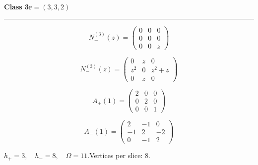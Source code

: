 \noindent\begin{minipage}{\linewidth}
\noindent\textbf{Class 3}\hfill $\symbf{r}=(3,3,2)$
\par\smallskip\noindent\textcolor{rulegray}{\rule{\linewidth}{0.3pt}}
\begin{minipage}[c]{0.495\linewidth}\centering\fontsize{10.5}{13}\selectfont
\setlength{\abovedisplayskip}{3pt}\setlength{\belowdisplayskip}{3pt}
\setlength{\abovedisplayshortskip}{3pt}\setlength{\belowdisplayshortskip}{3pt}
\setlength{\arraycolsep}{3.5pt}\renewcommand{\arraystretch}{1.18}
\[N_{+}^{(3)}(z)=\begin{pmatrix}0 & 0 & 0\\0 & 0 & 0\\0 & 0 & z\end{pmatrix}\]
\end{minipage}%
\begin{minipage}[c]{0.495\linewidth}\centering\fontsize{10.5}{13}\selectfont
\setlength{\abovedisplayskip}{3pt}\setlength{\belowdisplayskip}{3pt}
\setlength{\abovedisplayshortskip}{3pt}\setlength{\belowdisplayshortskip}{3pt}
\setlength{\arraycolsep}{3.5pt}\renewcommand{\arraystretch}{1.18}
\[N_{-}^{(3)}(z)=\begin{pmatrix}0 & z & 0\\z^{2} & 0 & z^{2} + z\\0 & z & 0\end{pmatrix}\]
\end{minipage}%
\par\noindent
\begin{minipage}[c]{0.495\linewidth}\centering\fontsize{10.5}{13}\selectfont
\setlength{\abovedisplayskip}{3pt}\setlength{\belowdisplayskip}{3pt}
\setlength{\abovedisplayshortskip}{3pt}\setlength{\belowdisplayshortskip}{3pt}
\setlength{\arraycolsep}{3.5pt}\renewcommand{\arraystretch}{1.18}
\[A_{+}(1)=\begin{pmatrix}2 & 0 & 0\\0 & 2 & 0\\0 & 0 & 1\end{pmatrix}\]
\end{minipage}%
\begin{minipage}[c]{0.495\linewidth}\centering\fontsize{10.5}{13}\selectfont
\setlength{\abovedisplayskip}{3pt}\setlength{\belowdisplayskip}{3pt}
\setlength{\abovedisplayshortskip}{3pt}\setlength{\belowdisplayshortskip}{3pt}
\setlength{\arraycolsep}{3.5pt}\renewcommand{\arraystretch}{1.18}
\[A_{-}(1)=\begin{pmatrix}2 & -1 & 0\\-1 & 2 & -2\\0 & -1 & 2\end{pmatrix}\]
\end{minipage}%
\par\smallskip\noindent\small $h_+=3,\quad h_-=8,\quad \Omega=11.$\quad Vertices per slice: 8.
\end{minipage}\par\vfill
